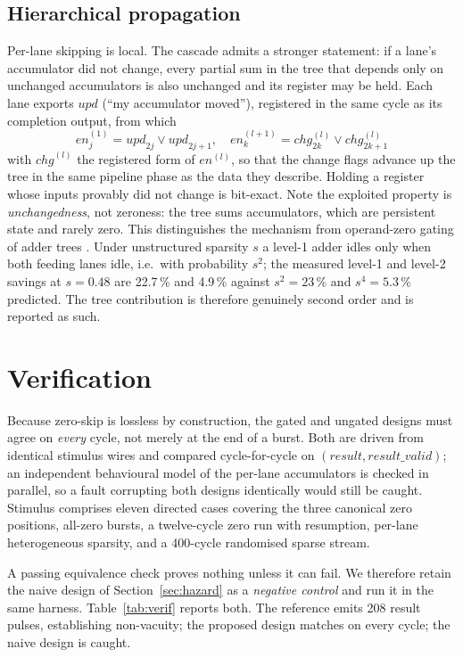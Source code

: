 \documentclass[journal,twocolumn]{IEEEtran}
\begin{document}
\subsection{Hierarchical propagation}
Per-lane skipping is local. The cascade admits a stronger statement: if a
lane's accumulator did not change, every partial sum in the tree that depends
only on unchanged accumulators is also unchanged and its register may be held.
Each lane exports $\mathit{upd}$ (``my accumulator moved''), registered in the
same cycle as its completion output, from which
\begin{equation}
\mathit{en}^{(1)}_{j}=\mathit{upd}_{2j}\vee \mathit{upd}_{2j+1},\quad
\mathit{en}^{(l+1)}_{k}=\mathit{chg}^{(l)}_{2k}\vee \mathit{chg}^{(l)}_{2k+1}
\end{equation}
with $\mathit{chg}^{(l)}$ the registered form of $\mathit{en}^{(l)}$, so that
the change flags advance up the tree in the same pipeline phase as the data
they describe. Holding a register whose inputs provably did not change is
bit-exact. Note the exploited property is \emph{unchangedness}, not zeroness:
the tree sums accumulators, which are persistent state and rarely zero. This
distinguishes the mechanism from operand-zero gating of adder trees
\cite{pat_img}. Under unstructured sparsity $s$ a level-1 adder idles only
when both feeding lanes idle, i.e.\ with probability $s^2$; the measured
level-1 and level-2 savings at $s=0.48$ are 22.7\,\% and 4.9\,\% against
$s^2=23\,\%$ and $s^4=5.3\,\%$ predicted. The tree contribution is therefore
genuinely second order and is reported as such.

\section{Verification}
\label{sec:verif}
Because zero-skip is lossless by construction, the gated and ungated designs
must agree on \emph{every} cycle, not merely at the end of a burst. Both are
driven from identical stimulus wires and compared cycle-for-cycle on
$(\mathit{result},\mathit{result\_valid})$; an independent behavioural model
of the per-lane accumulators is checked in parallel, so a fault corrupting
both designs identically would still be caught. Stimulus comprises eleven
directed cases covering the three canonical zero positions, all-zero bursts, a
twelve-cycle zero run with resumption, per-lane heterogeneous sparsity, and a
400-cycle randomised sparse stream.

A passing equivalence check proves nothing unless it can fail. We therefore
retain the naive design of Section~\ref{sec:hazard} as a \emph{negative
control} and run it in the same harness. Table~\ref{tab:verif} reports both.
The reference emits 208 result pulses, establishing non-vacuity; the proposed
design matches on every cycle; the naive design is caught.
\end{document}
